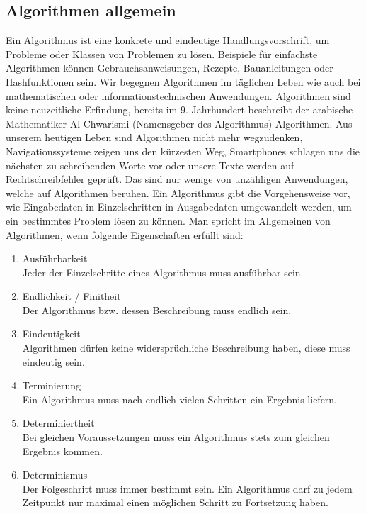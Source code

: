 \documentclass[a4paper]{llncs}
\begin{document}
\subsection{Algorithmen allgemein}
\label{Algorithmus}

Ein Algorithmus ist eine konkrete und eindeutige Handlungsvorschrift, um Probleme oder Klassen von Problemen zu lösen. Beispiele für einfachste Algorithmen können Gebrauchsanweisungen, Rezepte, Bauanleitungen oder Hashfunktionen sein. Wir begegnen Algorithmen im täglichen Leben wie auch bei mathematischen oder informationstechnischen Anwendungen. Algorithmen sind keine neuzeitliche Erfindung, bereits im 9. Jahrhundert beschreibt der arabische Mathe\-matiker Al-Chwarismi (Namensgeber des Algorithmus) Algorithmen. Aus unserem heutigen Leben sind Algorithmen nicht mehr wegzudenken, Navigationssysteme zeigen uns den kürzesten Weg, Smartphones schlagen uns die nächsten zu schreibenden Worte vor oder unsere Texte werden auf Rechtschreibfehler geprüft. Das sind nur wenige von unzähligen Anwendungen, welche auf Algorithmen beruhen. Ein Algorithmus gibt die Vorgehensweise vor, wie Eingabedaten in Einzelschritten in Ausgabedaten umgewandelt werden, um ein bestimmtes Problem lösen zu können. Man spricht im Allgemeinen von Algorithmen, wenn folgende Eigenschaften erfüllt sind:\\

\begin{enumerate}
 
\item Ausführbarkeit\\
Jeder der Einzelschritte eines Algorithmus muss ausführbar sein.\\

\item Endlichkeit / Finitheit\\
Der Algorithmus bzw. dessen Beschreibung muss endlich sein.\\ 

\item Eindeutigkeit\\
Algorithmen dürfen keine widersprüchliche Beschreibung haben, diese muss eindeutig sein.\\

\item Terminierung\\
Ein Algorithmus muss nach endlich vielen Schritten ein Ergebnis liefern.\\

\item Determiniertheit\\
Bei gleichen Voraussetzungen muss ein Algorithmus stets zum gleichen Ergebnis kommen.\\

\item Determinismus\\
Der Folgeschritt muss immer bestimmt sein. Ein Algorithmus darf zu jedem Zeitpunkt nur maximal einen möglichen Schritt zu Fortsetzung haben.\\ \\
\citep{EigenschaftenVonAlgorithmen}
\end{enumerate} 
\end{document}
